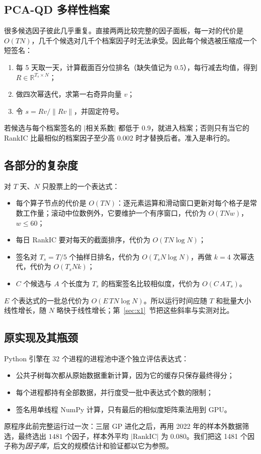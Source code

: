 \documentclass[11pt,a4paper,UTF8,fontset=fandol]{ctexart}
\begin{document}
\subsection{PCA-QD 多样性档案}
\label{sec:pcaqd}
很多候选因子彼此几乎重复。直接两两比较完整的因子面板，每一对的代价是 $O(TN)$，几千个候选对几千个档案因子时无法承受。因此每个候选被压缩成一个短签名：
\begin{enumerate}[nosep]
  \item 每 5 天取一天，计算截面百分位排名（缺失值记为 $0.5$），每行减去均值，得到 $R\in\mathbb{R}^{T_s\times N}$；
  \item 做四次幂迭代，求第一右奇异向量 $v$；
  \item 令 $s = Rv/\|Rv\|$，并固定符号。
\end{enumerate}
若候选与每个档案签名的 $|$相关系数$|$ 都低于 $0.9$，就进入档案；否则只有当它的 RankIC 比最相似的档案因子至少高 $0.002$ 时才替换后者。准入是串行的。

\subsection{各部分的复杂度}
\label{sec:cost}
对 $T$ 天、$N$ 只股票上的一个表达式：
\begin{itemize}[nosep]
  \item 每个算子节点的代价是 $O(TN)$：逐元素运算和滑动窗口更新对每个格子是常数工作量；滚动中位数例外，它要维护一个有序窗口，代价为 $O(TNw)$，$w\le60$；
  \item 每日 RankIC 要对每天的截面排序，代价为 $O(TN\log N)$；
  \item 签名对 $T_s=T/5$ 个抽样日排名，代价为 $O(T_s N\log N)$，再做 $k=4$ 次幂迭代，代价为 $O(T_s N k)$；
  \item $C$ 个候选与 $A$ 个长度为 $T_s$ 的档案签名比较相似度，代价为 $O(C\,A\,T_s)$。
\end{itemize}
$E$ 个表达式的一批总代价为 $O(E\,TN\log N)$。所以运行时间应随 $T$ 和批量大小线性增长，随 $N$ 略快于线性增长；第~\ref{sec:x1}~节把这些斜率与实测对比。

\subsection{原实现及其瓶颈}
\label{sec:legacy}
Python 引擎在 32 个进程的进程池中逐个独立评估表达式：
\begin{itemize}[nosep]
  \item 公共子树每次都从原始数据重新计算，因为它的缓存只保存最终得分；
  \item 每个进程都持有全部数据，并行度受一批中表达式个数的限制；
  \item 签名用单线程 NumPy 计算，只有最后的相似度矩阵乘法用到 GPU。
\end{itemize}
原程序此前完整运行过一次：三层 GP 进化之后，再用 2022 年的样本外数据筛选，最终选出 $1481$ 个因子，样本外平均 $|\mathrm{RankIC}|$ 为 $0.080$。我们把这 1481 个因子称为\emph{因子库}，后文的规模估计和验证都以它为参照。
\end{document}
